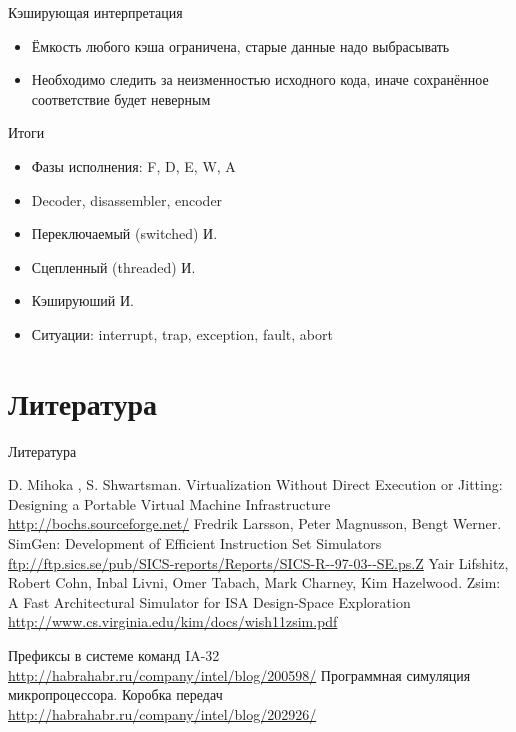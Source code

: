 \documentclass{beamer}
\begin{document}
\begin{frame}{Кэширующая интерпретация}
\begin{itemize}
\item Ёмкость любого кэша ограничена, старые данные надо выбрасывать
\item Необходимо следить за неизменностью исходного кода, иначе сохранённое соответствие будет неверным
\end{itemize}
\end{frame}

\begin{frame}{Итоги}
\begin{itemize}
\item Фазы исполнения: F, D, E, W, A
\item Decoder, disassembler, encoder
\item Переключаемый (switched) И.
\item Сцепленный (threaded) И.
\item Кэшируюший И.
\item Ситуации: interrupt, trap, exception, fault, abort
\end{itemize}
\end{frame}

\section{Литература}

\begin{frame}[allowframebreaks]{Литература}
\begin{thebibliography}{99}
     D. Mihoka , S. Shwartsman. Virtualization Without Direct Execution or Jitting: Designing a Portable Virtual Machine Infrastructure \url{http://bochs.sourceforge.net/}
     Fredrik Larsson, Peter Magnusson, Bengt Werner. SimGen: Development of Efficient Instruction Set Simulators
\url{ftp://ftp.sics.se/pub/SICS-reports/Reports/SICS-R--97-03--SE.ps.Z}
     Yair Lifshitz, Robert Cohn, Inbal Livni, Omer Tabach, Mark Charney, Kim Hazelwood. Zsim: A Fast Architectural Simulator for ISA Design-Space Exploration \url{http://www.cs.virginia.edu/kim/docs/wish11zsim.pdf}
    
     Префиксы в системе команд IA-32 \url{http://habrahabr.ru/company/intel/blog/200598/}
     Программная симуляция микропроцессора. Коробка передач \url{http://habrahabr.ru/company/intel/blog/202926/}

\end{thebibliography}
\end{frame}
\end{document}
